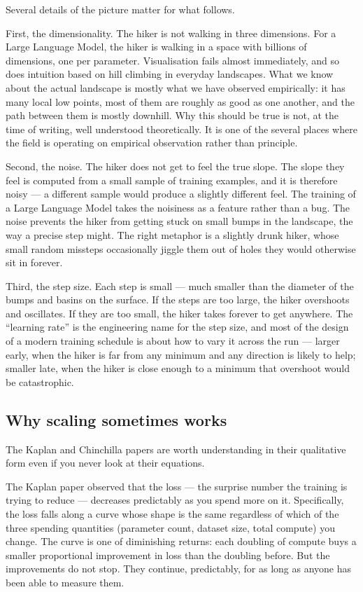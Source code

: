 Several details of the picture matter for what follows.

First, the dimensionality. The hiker is not walking in three
dimensions. For a Large Language Model, the hiker is walking
in a space with billions of dimensions, one per parameter.
Visualisation fails almost immediately, and so does intuition
based on hill climbing in everyday landscapes. What we know
about the actual landscape is mostly what we have observed
empirically: it has many local low points, most of them are
roughly as good as one another, and the path between them is
mostly downhill. Why this should be true is not, at the time
of writing, well understood theoretically. It is one of the
several places where the field is operating on empirical
observation rather than principle.

Second, the noise. The hiker does not get to feel the true
slope. The slope they feel is computed from a small sample of
training examples, and it is therefore noisy --- a different
sample would produce a slightly different feel. The training
of a Large Language Model takes the noisiness as a feature
rather than a bug. The noise prevents the hiker from getting
stuck on small bumps in the landscape, the way a precise step
might. The right metaphor is a slightly drunk hiker, whose
small random missteps occasionally jiggle them out of holes
they would otherwise sit in forever.

Third, the step size. Each step is small --- much smaller than
the diameter of the bumps and basins on the surface. If the
steps are too large, the hiker overshoots and oscillates. If
they are too small, the hiker takes forever to get anywhere.
The ``learning rate'' is the engineering name for the step
size, and most of the design of a modern training schedule is
about how to vary it across the run --- larger early, when the
hiker is far from any minimum and any direction is likely to
help; smaller late, when the hiker is close enough to a
minimum that overshoot would be catastrophic.

\subsection*{Why scaling sometimes works}

The Kaplan and Chinchilla papers are worth understanding in
their qualitative form even if you never look at their
equations.

The Kaplan paper observed that the loss --- the surprise number
the training is trying to reduce --- decreases predictably as
you spend more on it. Specifically, the loss falls along a
curve whose shape is the same regardless of which of the three
spending quantities (parameter count, dataset size, total
compute) you change. The curve is one of diminishing returns:
each doubling of compute buys a smaller proportional
improvement in loss than the doubling before. But the
improvements do not stop. They continue, predictably, for as
long as anyone has been able to measure them.

